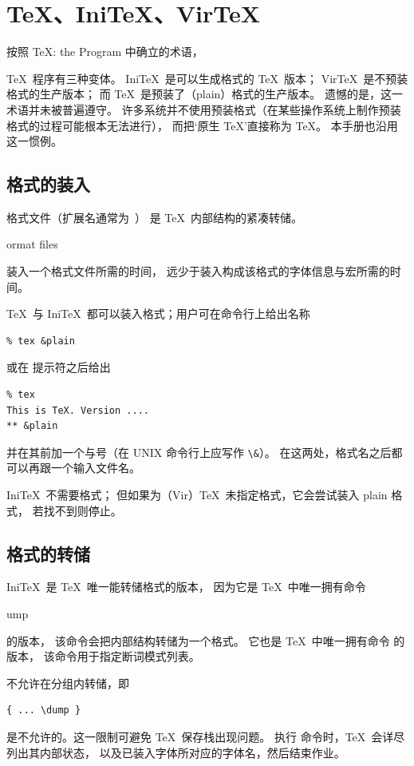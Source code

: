 \documentclass[a4paper]{rapport3}
\makeatletter
\def\IniTeX{Ini\TeX}\def\LamsTeX{LAMS\TeX}\def\VirTeX{Vir\TeX}
\def\term#1\par{\index{#1}}
\def\cstoidx#1\par{\index{#1@\cs{#1}}}
\def\csidx#1{\cstoidx #1\par\cs{#1}}
\makeatother
\begin{document}
\section{\TeX、\IniTeX、\VirTeX}

按照 {\italic \TeX: the Program}\cite{Knuth:TeXprogram} 中确立的术语，
\term\TeX\par\term\IniTeX\par\term\VirTeX\par
\TeX\ 程序有三种变体。
\IniTeX\ 是可以生成格式的 \TeX\ 版本；
\VirTeX\ 是不预装格式的生产版本；
而 \TeX\ 是预装了（plain）格式的生产版本。
遗憾的是，这一术语并未被普遍遵守。
许多系统并不使用预装格式（在某些操作系统上制作预装格式的过程可能根本无法进行），
而把`原生 \TeX'直接称为 \TeX。
本手册也沿用这一惯例。

\subsection{格式的装入}

格式文件（扩展名通常为~）
是 \TeX\ 内部结构的紧凑转储。
\term format files\par
装入一个格式文件所需的时间，
远少于装入构成该格式的字体信息与宏所需的时间。

\TeX\ 与 \IniTeX\ 都可以装入格式；用户可在命令行上给出名称
\begin{verbatim}
% tex &plain 
\end{verbatim}
或在 \n{**} 提示符之后给出
\begin{verbatim}
% tex
This is TeX. Version ....
** &plain 
\end{verbatim}
并在其前加一个与号（在 UNIX 命令行上应写作 \verb>\&>）。
在这两处，格式名之后都可以再跟一个输入文件名。

\IniTeX\ 不需要格式；
但如果为（Vir）\TeX\ 未指定格式，它会尝试装入 plain 格式，
若找不到则停止。

\subsection{格式的转储}

\IniTeX\ 是 \TeX\ 唯一能转储格式的版本，
因为它是 \TeX\ 中唯一拥有命令 \csidx{dump} 的版本，
该命令会把内部结构转储为一个格式。
它也是 \TeX\ 中唯一拥有命令  的版本，
该命令用于指定断词模式列表。

不允许在分组内转储，即
\begin{verbatim}
{ ... \dump }
\end{verbatim}
是不允许的。这一限制可避免 \TeX\ 保存栈出现问题。
执行  命令时，\TeX\ 会详尽列出其内部状态，
以及已装入字体所对应的字体名，然后结束作业。
\end{document}
